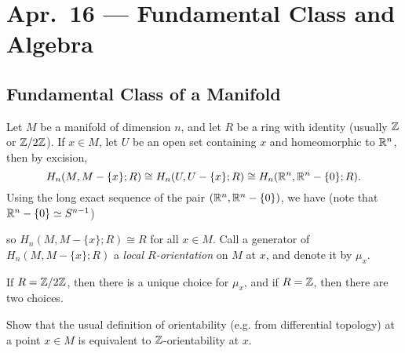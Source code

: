 \chapter{Apr.~16 --- Fundamental Class and Algebra}

\section{Fundamental Class of a Manifold}

\begin{definition}
  Let $M$ be a manifold of dimension $n$, and
  let $R$ be a ring with identity (usually
  $\mathbb{Z}$ or $\mathbb{Z} / 2\mathbb{Z}$). If $x \in M$, let
  $U$ be an open set containing $x$ and
  homeomorphic to $\mathbb{R}^n$, then by excision,
  \[
    H_n(M, M - \{x\}; R)
    \cong H_n(U, U - \{x\}; R)
    \cong H_n(\mathbb{R}^n, \mathbb{R}^n - \{0\}; R).
  \]
  Using the long exact sequence of the pair
  $(\mathbb{R}^n, \mathbb{R}^n - \{0\})$, we have (note that
  $\mathbb{R}^n - \{0\} \simeq S^{n - 1}$)
  \begin{center}
  \end{center}
  so $H_n(M, M - \{x\}; R) \cong R$ for
  all $x \in M$. Call a generator of
  $H_n(M, M - \{x\}; R)$ a \emph{local $R$-orientation}
  on $M$ at $x$, and denote it by $\mu_x$.
\end{definition}

\begin{remark}
  If $R = \mathbb{Z} / 2\mathbb{Z}$, then there is a unique
  choice for $\mu_x$, and if $R = \mathbb{Z}$, then
  there are two choices.
\end{remark}

\begin{exercise}
  Show that the usual definition of
  orientability (e.g. from differential topology) at a point $x \in M$ is
  equivalent to $\mathbb{Z}$-orientability at $x$.
\end{exercise}

